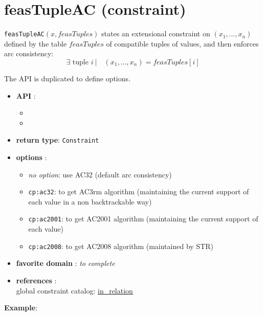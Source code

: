 \label{feastupleac}
\hypertarget{feastupleac}{}

\section{feasTupleAC (constraint)}\label{feastupleac:feastupleacconstraint}\hypertarget{feastupleac:feastupleacconstraint}{}
\begin{notedef}
  \texttt{feasTupleAC}$(x,feasTuples)$ states an extensional constraint on $(x_1,\ldots,x_n)$ defined by the table $feasTuples$ of compatible tuples of values, and then enforces arc consistency:
      $$\exists \text{ tuple } i\ |\quad (x_1,\ldots,x_n)=feasTuples[i]$$
\end{notedef}

The API is duplicated to define options.
\begin{itemize}
	\item \textbf{API} :
	\begin{itemize}
		\item {}
		\item {}
	\end{itemize}
	\item \textbf{return type}: \texttt{Constraint}
	\item \textbf{options} :
	\begin{itemize}
		\item \emph{no option}: use AC32 (default arc consistency)
		\item \texttt{cp:ac32}: to get AC3rm algorithm (maintaining the current support of each value in a non backtrackable way)
		\item \texttt{cp:ac2001}: to get AC2001 algorithm (maintaining the current support of each value)
		\item \texttt{cp:ac2008}: to get AC2008 algorithm (maintained by STR)
	\end{itemize}
	\item \textbf{favorite domain} : \emph{to complete}
	\item \textbf{references} :\\
      global constraint catalog: \href{http://www.emn.fr/x-info/sdemasse/gccat/Cin_relation.html}{in\_relation}
\end{itemize}

\textbf{Example}:

